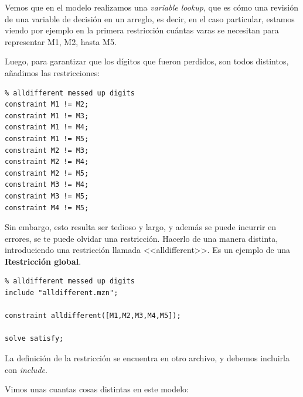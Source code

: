 \documentclass[12pt]{article}
\begin{document}
\begin{justify}
Vemos que en el modelo realizamos una \textit{variable lookup}, que es cómo una revisión de una variable de decisión en un arreglo, es decir, en el caso particular, estamos viendo por ejemplo en la primera restricción cuántas varas se necesitan para representar M1, M2, hasta M5. 
\end{justify}

\begin{justify}
Luego, para garantizar que los dígitos que fueron perdidos, son todos distintos, añadimos las restricciones:
\end{justify}

\begin{Verbatim}
% alldifferent messed up digits
constraint M1 != M2;
constraint M1 != M3;
constraint M1 != M4;
constraint M1 != M5;
constraint M2 != M3;
constraint M2 != M4;
constraint M2 != M5;
constraint M3 != M4;
constraint M3 != M5;
constraint M4 != M5;
\end{Verbatim}

\begin{justify}
Sin embargo, esto resulta ser tedioso y largo, y además se puede incurrir en errores, se te puede olvidar una restricción. Hacerlo de una manera distinta, introduciendo una restricción llamada <<alldifferent>>. Es un ejemplo de una \textbf{Restricción global}.
\end{justify}

\begin{Verbatim}
% alldifferent messed up digits
include "alldifferent.mzn";

constraint alldifferent([M1,M2,M3,M4,M5]);

solve satisfy;
\end{Verbatim}

\begin{justify}
La definición de la restricción se encuentra en otro archivo, y debemos incluirla con \textit{include}.
\end{justify}

\begin{justify}
Vimos unas cuantas cosas distintas en este modelo:
\end{justify}
\end{document}
